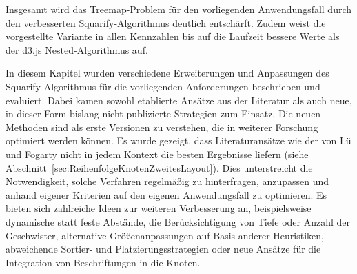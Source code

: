 Insgesamt wird das Treemap-Problem für den vorliegenden Anwendungsfall durch den verbesserten Squarify-Algorithmus deutlich entschärft. Zudem weist die vorgestellte Variante in allen Kennzahlen bis auf die Laufzeit bessere Werte als der d3.js Nested-Algorithmus auf.

\bigskip

In diesem Kapitel wurden verschiedene Erweiterungen und Anpassungen des Squarify-Algorithmus für die vorliegenden Anforderungen beschrieben und evaluiert. Dabei kamen sowohl etablierte Ansätze aus der Literatur als auch neue, in dieser Form bislang nicht publizierte Strategien zum Einsatz. Die neuen Methoden sind als erste Versionen zu verstehen, die in weiterer Forschung optimiert werden können. Es wurde gezeigt, dass Literaturansätze wie der von Lü und Fogarty nicht in jedem Kontext die besten Ergebnisse liefern (siehe Abschnitt~\ref{sec:ReihenfolgeKnotenZweitesLayout}). Dies unterstreicht die Notwendigkeit, solche Verfahren regelmäßig zu hinterfragen, anzupassen und anhand eigener Kriterien auf den eigenen Anwendungsfall zu optimieren. Es bieten sich zahlreiche Ideen zur weiteren Verbesserung an, beispielsweise dynamische statt feste Abstände, die Berücksichtigung von Tiefe oder Anzahl der Geschwister, alternative Größenanpassungen auf Basis anderer Heuristiken, abweichende Sortier- und Platzierungsstrategien oder neue Ansätze für die Integration von Beschriftungen in die Knoten.